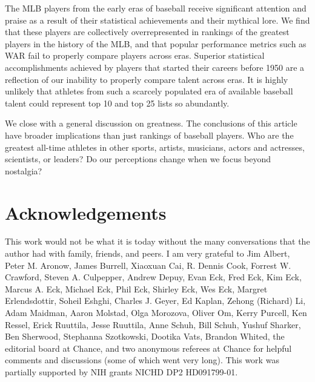 \documentclass[11pt]{article}\usepackage[]{graphicx}\usepackage[]{color}
\begin{document}

The MLB players from the early eras of baseball receive significant attention 
and praise as a result of their statistical achievements and their mythical 
lore.  We find that these players are collectively overrepresented in 
rankings of the greatest players in the history of the MLB, and that popular 
performance metrics such as WAR fail to properly compare players across eras.  
Superior statistical accomplishments achieved 
by players that started their careers before 1950 are a reflection of our 
inability to properly compare talent across eras.  It is highly unlikely that 
athletes from such a scarcely populated era of available baseball talent 
could represent top 10 and top 25 lists so abundantly. 

We close with a general discussion on greatness.  The conclusions of this 
article have broader implications than just rankings of baseball players.  
Who are the greatest all-time athletes in other sports, 
artists, 
musicians, 
actors and actresses,
scientists, or 
leaders?  Do our perceptions change when we focus beyond nostalgia?  

\section*{Acknowledgements}
This work would not be what it is today without the many conversations that 
the author had with family, friends, and peers.
I am very grateful to 
Jim Albert, 
Peter M. Aronow, 
James Burrell, 
Xiaoxuan Cai, 
R. Dennis Cook, 
Forrest W. Crawford, 
Steven A. Culpepper, 
Andrew Depuy, 
Evan Eck, 
Fred Eck, 
Kim Eck, 
Marcus A. Eck, 
Michael Eck, 
Phil Eck, 
Shirley Eck, 
Wes Eck, 
Margret Erlendsdottir, 
Soheil Eshghi, 
Charles J. Geyer, 
Ed Kaplan, 
Zehong (Richard) Li, 
Adam Maidman, 
Aaron Molstad, 
Olga Morozova, 
Oliver Om, 
Kerry Purcell, 
Ken Ressel, 
Erick Ruuttila, 
Jesse Ruuttila, 
Anne Schuh, 
Bill Schuh, 
Yushuf Sharker, 
Ben Sherwood, 
Stephanna Szotkowski,
Dootika Vats,
Brandon Whited,
the editorial board at Chance, 
and 
two anonymous referees at Chance
for helpful comments and discussions (some of which went very long).
This work was partially supported by NIH grants NICHD DP2 HD091799-01.
\end{document}
